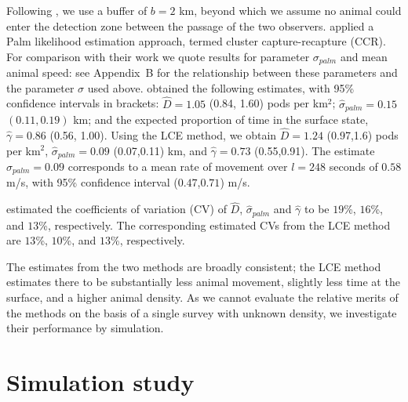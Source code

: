 \documentclass[useAMS, usenatbib, referee]{biom}\usepackage[]{graphicx}\usepackage[]{color}
\begin{document}

Following \cite{Stevenson+al:18}, we use a buffer of $b=2$ km, beyond which we assume no animal could enter the detection zone between the passage of the two observers.  \cite{Stevenson+al:18} applied a Palm likelihood estimation approach, termed cluster capture-recapture (CCR). For comparison with their work we quote results for parameter $\sigma_{palm}$ and mean animal speed: see Appendix~B for the relationship between these parameters and the parameter $\sigma$ used above. \cite{Stevenson+al:18} obtained the following estimates, with 95\% confidence intervals in brackets: $\hat{D}=1.05$ (0.84, 1.60) pods per km$^2$; $\hat{\sigma}_{palm}=0.15$ $(0.11, 0.19)$ km; and the expected proportion of time in the surface state, $\hat{\gamma}=0.86$ (0.56, 1.00). Using the LCE method, we obtain $\hat{D}=1.24$ (0.97,1.6) pods per km$^2$, $\hat{\sigma}_{palm}=0.09$ (0.07,0.11) km, and $\hat{\gamma}=0.73$ (0.55,0.91). The estimate $\hat{\sigma}_{palm}=0.09$ corresponds to a mean rate of movement over $l=248$ seconds of $0.58$ m/s, with 95\% confidence interval ($0.47$,$0.71$) m/s.

\cite{Stevenson+al:18} estimated the coefficients of variation (CV) of $\hat{D}$, $\hat{\sigma}_{palm}$ and $\hat{\gamma}$ to be $19$\%, $16$\%, and $13$\%, respectively. The corresponding estimated CVs from the LCE method are $13$\%, $10$\%, and $13$\%, respectively.

The estimates from the two methods are broadly consistent; the LCE method estimates there to be substantially less animal movement, slightly less time at the surface, and a higher animal density. As we cannot evaluate the relative merits of the methods on the basis of a single survey with unknown density, we investigate their performance by simulation.


\section{Simulation study \label{sec:sim}}

\end{document}
